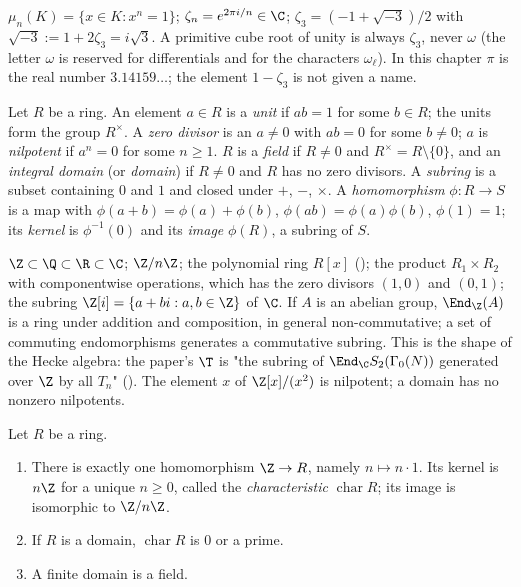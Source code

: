 \begin{convention}\label{conv:rings:roots}
$\mu_n(K)=\{x\in K:x^n=1\}$; $\zeta_n=e^{2\pi i/n}\in\C$; $\zeta_3=(-1+\sqrt{-3})/2$ with $\sqrt{-3}:=1+2\zeta_3=i\sqrt3$. A primitive cube
root of unity is always $\zeta_3$, never $\omega$ (the letter $\omega$ is reserved for differentials and for the
characters $\omega_\ell$). In this chapter $\pi$ is the real number $3.14159\ldots$; the element $1-\zeta_3$ is not given a name.
\end{convention}

\begin{definition}\label{def:rings:ring}
Let $R$ be a ring. An element $a\in R$ is a \emph{unit} if $ab=1$ for some $b\in R$; the units form the group $R^\times$. A
\emph{zero divisor} is an $a\ne0$ with $ab=0$ for some $b\ne0$; $a$ is \emph{nilpotent} if $a^n=0$ for some $n\ge1$. $R$ is a
\emph{field} if $R\ne0$ and $R^\times=R\setminus\{0\}$, and an \emph{integral domain} (or \emph{domain}) if $R\ne0$ and $R$ has no zero divisors.
A \emph{subring} is a subset containing $0$ and $1$ and closed under $+$, $-$, $\times$. A \emph{homomorphism} $\phi\colon R\to S$ is a
map with $\phi(a+b)=\phi(a)+\phi(b)$, $\phi(ab)=\phi(a)\phi(b)$, $\phi(1)=1$; its \emph{kernel} is $\phi^{-1}(0)$ and its \emph{image}
$\phi(R)$, a subring of $S$.
\end{definition}

\begin{example}\label{ex:rings:rings}
$\Z\subset\Q\subset\R\subset\C$; $\Z/n\Z$; the polynomial ring $R[x]$ (); the product $R_1\times R_2$ with
componentwise operations, which has the zero divisors $(1,0)$ and $(0,1)$; the subring $\Z[i]=\{a+bi:a,b\in\Z\}$ of $\C$. If $A$
is an abelian group, $\End_\Z(A)$ is a ring under addition and composition, in general non-commutative; a set of
commuting endomorphisms generates a commutative subring. This is the shape of the Hecke algebra: the paper's $\T$ is
"the subring of $\End_\C S_2(\Gamma_0(N))$ generated over $\Z$ by all $T_n$" (). The element $x$ of $\Z[x]/(x^2)$ is
nilpotent; a domain has no nonzero nilpotents.
\end{example}

\begin{proposition}\label{prop:rings:characteristic}
Let $R$ be a ring.
\begin{enumerate}[label=(\roman*)]
\item There is exactly one homomorphism $\Z\to R$, namely $n\mapsto n\cdot1$. Its kernel is $n\Z$ for a unique $n\ge0$, called the
\emph{characteristic} $\operatorname{char}R$; its image is isomorphic to $\Z/n\Z$.
\item If $R$ is a domain, $\operatorname{char}R$ is $0$ or a prime.
\item A finite domain is a field.
\end{enumerate}
\end{proposition}

